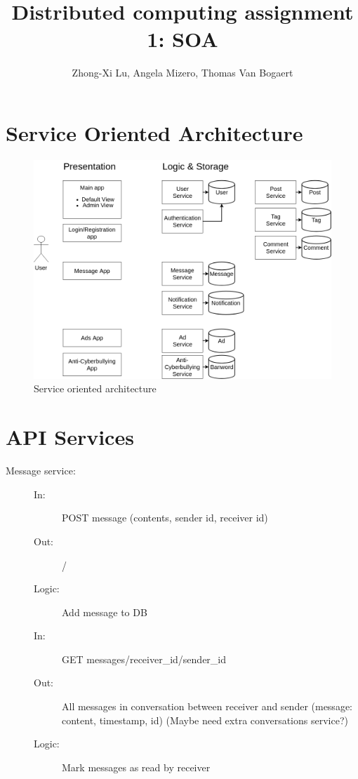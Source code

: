 \documentclass{article}
\title{Distributed computing assignment 1: SOA}
\author{Zhong-Xi Lu, Angela Mizero, Thomas Van Bogaert}
\date{}
\begin{document}
\maketitle

\section{Service Oriented Architecture}

\begin{figure}[H]
    \centering
    \includegraphics[width=\textwidth]{DC.png}
    \caption{Service oriented architecture}
    \label{soa}
\end{figure}

\section{API Services}

\begin{description}
    \item [Message service:] 
    \begin{description}
        \item[]
        \item[In:] POST message (contents, sender id, receiver id)
        \item[Out:] /
        \item[Logic:] Add message to DB
        \item[]
        
        \item[In:] GET messages/receiver\_id/sender\_id
        \item[Out:] All messages in conversation between receiver and sender (message: content, timestamp, id) (Maybe need extra conversations service?)
        \item[Logic:] Mark messages as read by receiver
        \item[]
    \end{description}
\end{description}
\end{document}
